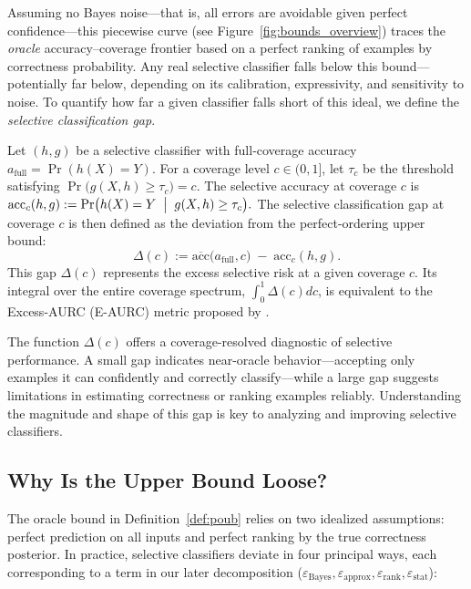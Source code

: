 Assuming no Bayes noise—that is, all errors are avoidable given perfect confidence—this piecewise curve (see Figure~\ref{fig:bounds_overview}) traces the \emph{oracle} accuracy–coverage frontier based on a perfect ranking of examples by correctness probability. Any real selective classifier falls below this bound—potentially far below, depending on its calibration, expressivity, and sensitivity to noise. To quantify how far a given classifier falls short of this ideal, we define the \emph{selective classification gap}.

\begin{definition}
\label{def:gap}
Let \((h,g)\) be a selective classifier with full‑coverage accuracy 
\(a_{\mathrm{full}}=\Pr(h(X)=Y)\).  For a coverage level \(c\in(0,1]\), let
\(\tau_c\) be the threshold satisfying \(\Pr\bigl(g(X,h)\ge\tau_c\bigr)=c\).  The selective accuracy at coverage \(c\) is
\(
\mathrm{acc}_c(h,g)
:=
\Pr\bigl(h(X)=Y \;\bigm|\; g(X,h)\ge\tau_c\bigr).
\)
The selective classification gap at coverage \(c\) is then defined as the deviation from the perfect-ordering upper bound:
\begin{equation}
\Delta(c)
:=
\overline{\mathrm{acc}}\bigl(a_{\mathrm{full}},c\bigr)
\;-\;\mathrm{acc}_c(h,g).
\end{equation}
This gap $\Delta(c)$ represents the excess selective risk at a given coverage $c$. Its integral over the entire coverage spectrum, $\int_0^1 \Delta(c) dc$, is equivalent to the Excess-AURC (E-AURC) metric proposed by \citet{geifman2018bias}.
\end{definition}

The function \(\Delta(c)\) offers a coverage-resolved diagnostic of selective performance. A small gap indicates near-oracle behavior—accepting only examples it can confidently and correctly classify—while a large gap suggests limitations in estimating correctness or ranking examples reliably. Understanding the magnitude and shape of this gap is key to analyzing and improving selective classifiers.

\subsection{Why Is the Upper Bound Loose?}
\label{sec:why-loose}

The oracle bound in Definition~\ref{def:poub} relies on two idealized
assumptions: perfect prediction on all inputs and perfect ranking by
the true correctness posterior. In practice, selective classifiers deviate in
four principal ways, each corresponding to a term in our later
decomposition (\(\varepsilon_{\text{Bayes}},\varepsilon_{\text{approx}},
\varepsilon_{\text{rank}},\varepsilon_{\text{stat}}\)):

